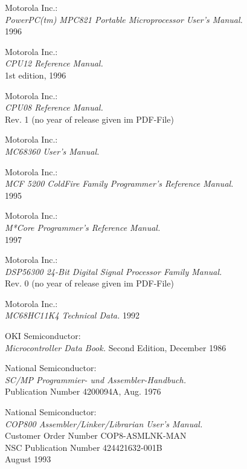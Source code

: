  Motorola Inc.: \\
                 {\em PowerPC(tm) MPC821 Portable Microprocessor User's Manual.\/} \\
                 1996

 Motorola Inc.: \\
                {\em CPU12 Reference Manual.\/} \\
                1st edition, 1996

 Motorola Inc.: \\
                {\em CPU08 Reference Manual.\/} \\
                Rev. 1 (no year of release given im PDF-File)

 Motorola Inc.: \\
                 {\em MC68360 User's Manual.\/}

 Motorola Inc.: \\
                  {\em MCF 5200 ColdFire Family Programmer's Reference
                   Manual.\/} \\
                  1995

 Motorola Inc.: \\
                   {\em M*Core Programmer's Reference Manual.\/} \\
                   1997

 Motorola Inc.: \\
                   {\em DSP56300 24-Bit Digital Signal Processor
                    Family Manual.\/} \\
                   Rev. 0 (no year of release given im PDF-File)

 Motorola Inc.: \\
                {\em MC68HC11K4 Technical Data.\/}
                1992

 OKI Semiconductor: \\
                {\em Microcontroller Data Book.\/}
                Second Edition, December 1986

 National Semiconductor: \\
               {\em SC/MP Program\-mier- und
                As\-sem\-bler-Hand\-buch.\/} \\
               Publication Number 4200094A, Aug. 1976

 National Semiconductor: \\
                 {\em COP800 Assembler/Linker/Librarian User's
                 Manual.\/} \\
                 Customer Order Number COP8-ASMLNK-MAN \\
                 NSC Publication Number 424421632-001B \\
                 August 1993

